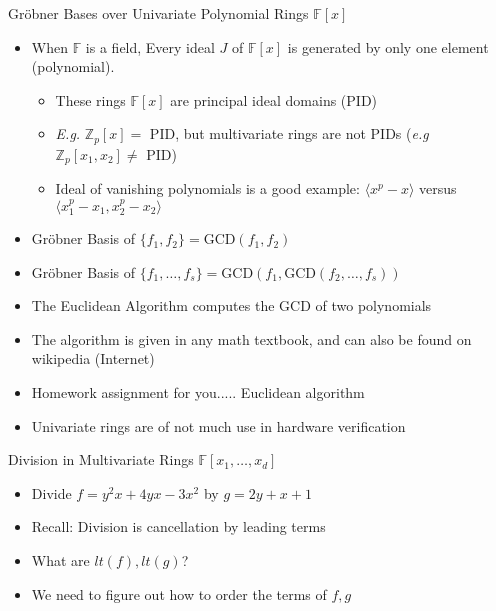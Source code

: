 \documentclass[xcolor=dvipsnames]{beamer}
\newcommand{\Zp}{{\mathbb{Z}}_{p}}
\newcommand{\F}{{\mathbb{F}}}
\newcommand{\bi}{\begin{itemize}}
\newcommand{\ei}{\end{itemize}}
\begin{document}
\begin{frame}{{\large Gr\"obner Bases over Univariate Polynomial Rings
      $\F[x]$}}

\bi
\item When $\F$ is a field, \alert{Every ideal} $J$ of $\F[x]$ is
  generated by only one element (polynomial).
\bi
\item These rings $\F[x]$ are \alert{principal ideal domains (PID)}
\item {\it E.g.} $\Zp[x]=$ PID, but multivariate rings are not PIDs
  ({\it e.g} $\Zp[x_1, x_2] \neq$ PID)
\item Ideal of vanishing polynomials is a good example: $\langle x^p-x
  \rangle$ versus $\langle x_1^p - x_1, x_2^p - x_2 \rangle$
\ei
\item Gr\"obner Basis of $\{f_1, f_2\} = \text{GCD}(f_1, f_2)$
\item Gr\"obner Basis of $\{f_1, \dots, f_s\} = \text{GCD}(f_1,
  \text{GCD}(f_2, \dots, f_s))$
\item The Euclidean Algorithm computes the GCD of two polynomials
\item The algorithm is given in any math textbook, and can also be
  found on wikipedia (Internet)
\item Homework assignment for you..... Euclidean algorithm
\item Univariate rings are of not much use in hardware verification 
\ei

\end{frame}


\begin{frame}{{\large Division in Multivariate Rings $\F[x_1, \dots, x_d]$}}

\bi [<+->]
\item Divide $f = y^2x + 4yx - 3x^2$ by $g = 2y + x + 1$
\item Recall: Division is cancellation by leading terms
\item What are $lt(f), lt(g)$?
\item We need to figure out how to order the terms of $f, g$
\ei



\end{frame}
\end{document}
